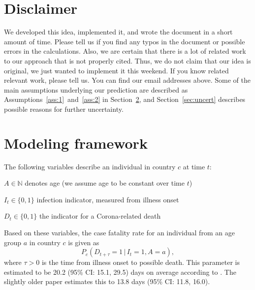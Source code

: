 \documentclass[a4paper]{article}
\newcommand\N{\mathbb{N}}
\newcommand{\given}{\, \vert \,}
\begin{document}




\section{Disclaimer} \label{sec:disclaimer}

We 
developed this idea, implemented it, and 
wrote the 
document in a short amount of time. Please tell us if you find any typos 
in the document or possible errors in 
the calculations. 
Also, we are certain that there is a lot of 
related work to our approach that is not properly cited. 
Thus, we do not claim that our idea is original, we just wanted
to implement it this weekend.
If you know related relevant work, please tell us.
You can find our email addresses above.
Some of the main assumptions underlying our prediction are described 
as Assumptions~\ref{ass:1}~and~\ref{ass:2} in Section~\ref{sec:model}, and
Section~\ref{sec:uncert} describes possible reasons for further uncertainty.


\section{Modeling framework} \label{sec:model}
The following variables describe an individual in country $c$ at time $t$:
\begin{compactitem}
\item $A \in \N$ denotes age (we assume age to be constant over time $t$)
\item $I_t \in \{0,1\}$ infection indicator, measured from illness onset
\item $D_t \in \{0,1\}$ the indicator for a Corona-related death
\end{compactitem}
Based on these variables, the case fatality rate for an 
individual from an age group $a$ in country $c$ is given as
\begin{equation*}
  P_c(D_{t+\tau} = 1 \given I_t = 1, A = a), 
\end{equation*}
where $\tau > 0$ is the time from illness onset to possible
death. This parameter is estimated to be 20.2 (95\% CI: 15.1, 29.5) days on
average according to \citet{jung2020real}. The slightly older paper
\cite{linton2020epidemiological} estimates this to
13.8 days (95\% CI: 11.8, 16.0).
\end{document}
